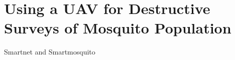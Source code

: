 \chapter[UAV Surveying Mosquitoes]{Using a UAV for Destructive Surveys of Mosquito Population}

Smartnet and Smartmosquito











%
%
%
%
